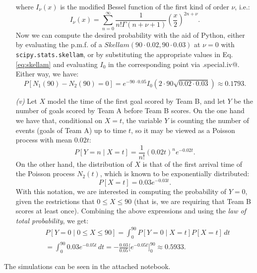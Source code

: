 \begin{enumerate}
        where $I_\nu(x)$ is the modified Bessel function of the first kind of order \( \nu \), i.e.:
\[
  I_{\nu}(x) = \sum_{n=0}^{\infty} \frac{1}{n! \Gamma(n + \nu + 1)}\left( \frac{x}{2} \right)^{2n + \nu}.
\]
Now we can compute the desired probability with the aid of Python, either by evaluating the p.m.f. of a $Skellam(90\cdot 0.02, 90\cdot 0.03)$ at $\nu=0$ with \verb|scipy.stats.skellam|, or by substituting the appropriate values in Eq. \eqref{eq:skellam} and evaluating $I_0$ in the corresponding point via \verb@scipy.special.iv@. Either way, we have:
\[
P[N_1(90)- N_2(90) = 0]=e^{-90\cdot 0.05}I_0(2\cdot 90\sqrt{0.02\cdot 0.03}) \approx 0.1793.
\]
  \item[\textit{(v)}] Let $X$ model the time of the first goal scored by Team B, and let $Y$ be the number of goals scored by Team A before Team B scores. On the one hand we have that, conditional on $X=t$, the variable $Y$ is counting the number of events (goals of Team A) up to time $t$, so it may be viewed as a Poisson process with mean $0.02t$:
  \[
  P[Y=n\mid X=t]=\frac{1}{n!}(0.02t)^n e^{-0.02t}.
  \]
  On the other hand, the distribution of $X$ is that of the first arrival time of the Poisson process $N_2(t)$, which is known to be exponentially distributed:
  \[
  P[X=t]= 0.03e^{-0.03t}.
  \]
  With this notation, we are interested in computing the probability of $Y=0$, given the restrictions that $0\leq X\leq 90$ (that is, we are requiring that Team B scores at least once). Combining the above expressions and using the \textit{law of total probability}, we get:
  \[
  \begin{aligned}
  &P[Y=0\mid0\leq X \leq 90]=\int_0^{90} P[Y=0\mid X=t]P[X=t]\, dt\\
  &=  \int_0^{90}0.03 e^{-0.05t}\, dt= -\frac{0.03}{0.05}\Big[ e^{-0.05t}\Big]_0^{90} \approx 0.5933.
\end{aligned}
  \]
\end{enumerate}

The simulations can be seen in the attached notebook.\\
